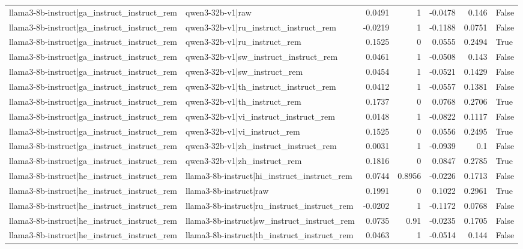 \begin{table}
\begin{tabular}{l l r r r r l}
llama3-8b-instruct|ga_instruct_instruct_rem & qwen3-32b-v1|raw & 0.0491 & 1 & -0.0478 & 0.146 & False \\
llama3-8b-instruct|ga_instruct_instruct_rem & qwen3-32b-v1|ru_instruct_instruct_rem & -0.0219 & 1 & -0.1188 & 0.0751 & False \\
llama3-8b-instruct|ga_instruct_instruct_rem & qwen3-32b-v1|ru_instruct_rem & 0.1525 & 0 & 0.0555 & 0.2494 & True \\
llama3-8b-instruct|ga_instruct_instruct_rem & qwen3-32b-v1|sw_instruct_instruct_rem & 0.0461 & 1 & -0.0508 & 0.143 & False \\
llama3-8b-instruct|ga_instruct_instruct_rem & qwen3-32b-v1|sw_instruct_rem & 0.0454 & 1 & -0.0521 & 0.1429 & False \\
llama3-8b-instruct|ga_instruct_instruct_rem & qwen3-32b-v1|th_instruct_instruct_rem & 0.0412 & 1 & -0.0557 & 0.1381 & False \\
llama3-8b-instruct|ga_instruct_instruct_rem & qwen3-32b-v1|th_instruct_rem & 0.1737 & 0 & 0.0768 & 0.2706 & True \\
llama3-8b-instruct|ga_instruct_instruct_rem & qwen3-32b-v1|vi_instruct_instruct_rem & 0.0148 & 1 & -0.0822 & 0.1117 & False \\
llama3-8b-instruct|ga_instruct_instruct_rem & qwen3-32b-v1|vi_instruct_rem & 0.1525 & 0 & 0.0556 & 0.2495 & True \\
llama3-8b-instruct|ga_instruct_instruct_rem & qwen3-32b-v1|zh_instruct_instruct_rem & 0.0031 & 1 & -0.0939 & 0.1 & False \\
llama3-8b-instruct|ga_instruct_instruct_rem & qwen3-32b-v1|zh_instruct_rem & 0.1816 & 0 & 0.0847 & 0.2785 & True \\
llama3-8b-instruct|he_instruct_instruct_rem & llama3-8b-instruct|hi_instruct_instruct_rem & 0.0744 & 0.8956 & -0.0226 & 0.1713 & False \\
llama3-8b-instruct|he_instruct_instruct_rem & llama3-8b-instruct|raw & 0.1991 & 0 & 0.1022 & 0.2961 & True \\
llama3-8b-instruct|he_instruct_instruct_rem & llama3-8b-instruct|ru_instruct_instruct_rem & -0.0202 & 1 & -0.1172 & 0.0768 & False \\
llama3-8b-instruct|he_instruct_instruct_rem & llama3-8b-instruct|sw_instruct_instruct_rem & 0.0735 & 0.91 & -0.0235 & 0.1705 & False \\
llama3-8b-instruct|he_instruct_instruct_rem & llama3-8b-instruct|th_instruct_instruct_rem & 0.0463 & 1 & -0.0514 & 0.144 & False \\

\end{tabular}
\end{table}
